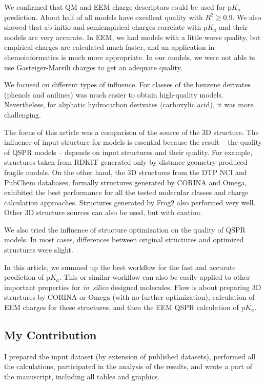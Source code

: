 We confirmed that QM and EEM charge descriptors could be used for p$K_a$
prediction. About half of all models have excellent quality with $R^2 \geq 0.9$.
We also showed that ab initio and semiempirical charges correlate with p$K_a$
and their models are very accurate. In EEM, we had models with a little worse
quality, but empirical charges are calculated much faster, and an application
in chemoinformatics is much more appropriate. In our models, we were not able
to use Gasteiger-Marsili charges to get an adequate quality. 

We focused on different types of influence. For classes of the benzene
de\-ri\-vates (phenols and anilines) was much easier to obtain high-quality models.
Nevertheless, for aliphatic hydrocarbon derivates (carboxylic acid), it was more
challenging.

The focus of this article was a comparison of the source of the 3D structure.
The influence of input structure for models is essential because
the result -- the quality of QSPR models -- depends on input structures and
their quality. For example, structures taken from RDKIT generated only by
distance geometry produced fragile models. On the other hand, the 3D structures
from the DTP NCI and PubChem databases, formally structures generated by CORINA
and Omega, exhibited the best performance for all the tested molecular classes
and charge calculation approaches. Structures generated by Frog2 also performed
very well. Other 3D structure sources can also be used, but with caution.

We also tried the influence of structure optimization on the quality of QSPR
models. In most cases, differences between original structures and optimized
structures were slight. 

In this article, we summed up the best workflow for the fast and accurate
prediction of p$K_a$. This or similar workflow can also be easily applied to other
important properties for \textit{in~silico} designed molecules. Flow is about preparing
3D structures by CORINA or Omega (with no further optimization), calculation of
EEM charges for these structures, and then the EEM QSPR calculation of p$K_a$.

\subsection{My Contribution}

I prepared the input dataset (by extension of published datasets), performed
all the calculations, participated in the analysis of the results, and wrote
a part of the manuscript, including all tables and graphics.

